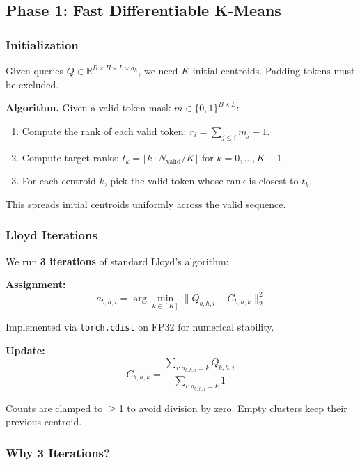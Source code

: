 \subsection{Phase 1: Fast Differentiable K-Means}

\subsubsection{Initialization}

Given queries $Q \in \mathbb{R}^{B \times H \times L \times d_h}$, we need 
$K$ initial centroids. Padding tokens must be excluded.

\textbf{Algorithm.} Given a valid-token mask $m \in \{0, 1\}^{B \times L}$:

\begin{enumerate}
\item Compute the rank of each valid token: $r_i = \sum_{j \leq i} m_j - 1$.
\item Compute target ranks: $t_k = \lfloor k \cdot N_\text{valid} / K \rfloor$
  for $k = 0, \dots, K-1$.
\item For each centroid $k$, pick the valid token whose rank is closest to $t_k$.

\end{enumerate}
This spreads initial centroids uniformly across the valid sequence.

\subsubsection{Lloyd Iterations}

We run \textbf{3 iterations} of standard Lloyd's algorithm:

\textbf{Assignment:}
\begin{equation}
a_{b,h,i} = \arg\min_{k \in [K]} \|Q_{b,h,i} - C_{b,h,k}\|_2^2
\end{equation}

Implemented via \texttt{torch.cdist} on FP32 for numerical stability.

\textbf{Update:}
\begin{equation}
C_{b,h,k} = \frac{\sum_{i: a_{b,h,i} = k} Q_{b,h,i}}{\sum_{i: a_{b,h,i} = k} 1}
\end{equation}

Counts are clamped to $\ge$1 to avoid division by zero. Empty clusters keep 
their previous centroid.

\subsubsection{Why 3 Iterations?}

